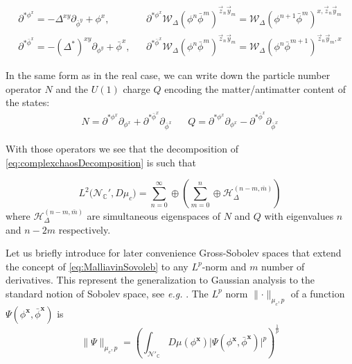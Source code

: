 \documentclass{elsarticle}%
\begin{document}
\begin{align}
\label{eq:holomorphicSkorokhod}
\partial^{*\phi^x} =-\Delta^{xy}\partial_{\bar\phi^y}+\phi^x, & &\partial^{*\phi^x}\mathcal{W}_\Delta(\phi^{n}\bar{\phi}^m)^{\vec{z}_{n}\vec{y}_m}= \mathcal{W}_\Delta(\phi^{n+1}\bar{\phi}^m)^{x,\vec{z}_{n}\vec{y}_m}\nonumber \\
\partial^{*\bar\phi^x} =-(\Delta^*)^{xy}\partial_{\phi^y}+\bar\phi^x, & &\partial^{*\bar\phi^x}\mathcal{W}_\Delta(\phi^{n}\bar{\phi}^m)^{\vec{z}_{n}\vec{y}_m}= \mathcal{W}_\Delta(\phi^{n}\bar{\phi}^{m+1})^{\vec{z}_{n}\vec{y}_m,x}
\end{align}

In the same  form as in the real case, we can write down the particle number operator $N$ and the $U(1)$ charge $Q$ encoding the matter/antimatter content of the states:
\begin{align}
\label{eq:ChargeAndNumber}
    N=\partial^{*\phi^x}\partial_{\phi^x}+ \partial^{*\bar\phi^x}\partial_{\bar\phi^x} & & Q=\partial^{*\phi^x}\partial_{\phi^x}- \partial^{*\bar\phi^x}\partial_{\bar\phi^x}
\end{align}

With those operators we see that the decomposition of \eqref{eq:complexchaosDecomposition} is such that

\begin{equation}
\label{eq:descompositionCharge}
L^2\big({\mathcal{N}_{\mathbb{C}}'},D\mu_c\big)=\sum_{n=0}^\infty\oplus \left( \sum_{m=0}^n\oplus \mathcal{H}_\Delta^{(n-m,\bar{m})} \right)
\end{equation}
where $\mathcal{H}_\Delta^{(n-m,\bar{m})}$ are simultaneous eigenspaces of $N$ and $Q$ with eigenvalues $n$ and $n-2m$ respectively. 

 Let us briefly introduce for later convenience Gross-Sobolev spaces \cite{huAnalysisGaussian2016} that extend the concept of \eqref{eq:MalliavinSovoleb} to any $L^p$-norm and $m$ number of derivatives. This represent the generalization to Gaussian analysis to the standard notion of Sobolev space, see \textit{e.g.} \cite{trevesTopologicalVector1967}. The $L^p$ norm $\lVert  \cdot \rVert_{\mu_c,p}$ of a function $\Psi(\phi^{\mathbf{x}},\bar\phi^{\mathbf{x}})$  is 
$$\lVert \Psi \rVert_{\mu_c,p} = \left(\int_{\mathcal{N}'_{\mathbb{C}}}D\mu(\phi^\mathbf{x})\lvert \Psi(\phi^{\mathbf{x}},\bar\phi^{\mathbf{x}}) \rvert^p\right)^{\frac1p}$$
\end{document}
